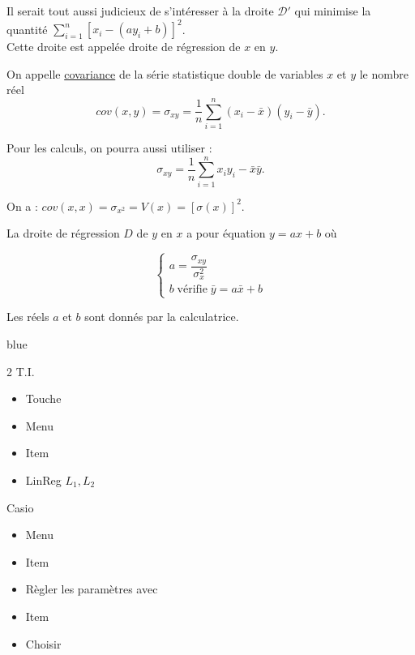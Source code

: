 \documentclass[french]{book}
\newcommand{\Syst}[2]{\left\{\begin{array}{lcccc} #1 \\ #2 \end{array}\right.}
\begin{document}
\begin{rem}
   Il serait tout aussi judicieux de s'intéresser à la droite $\mathcal{D}'$ qui minimise la quantité $\displaystyle{\sum_{i=1}^n [x_i-(ay_i+b)]^2}$. \\
   Cette droite est appelée droite de régression de $x$ en $y$.
\end{rem}



\begin{defn}
   On appelle \underline{covariance} de la série statistique double de variables $x$ et $y$ le nombre réel
$$cov(x,y)=\sigma_{xy}=\frac1n\sum_{i=1}^n (x_i - \bar x) (y_i - \bar y).$$
\end{defn}

Pour les calculs, on pourra aussi utiliser :
$$\sigma_{xy}=\frac1n\sum_{i=1}^n x_i y_i-\bar x\bar y.$$

\begin{rem}
   On a : \quad $cov(x,x)=\sigma_{x^2}=V(x)=[\sigma(x)]^2$.
\end{rem}



\begin{prop}
   La droite de régression $D$ de $y$ en $x$ a pour équation $y=ax+b$ où 
   
  
  $$\Syst{a=\dfrac{\sigma_{xy}}{\sigma_{x}^2}}{b \; \text{vérifie} \; \bar y = a\bar x +b}$$
\end{prop}

\begin{rem}
   Les réels $a$ et $b$ sont donnés par la calculatrice.
\end{rem}

\begin{color}{blue}
\begin{multicols}{2}
   T.I.
   \begin{itemize}
      \item[$\bullet$] Touche 
      \item[$\bullet$] Menu 
      \item[$\bullet$] Item 
      \item[$\bullet$] LinReg $L_1,L_2$ \\
   \end{itemize}
   Casio
   \begin{itemize}
      \item[$\bullet$] Menu 
      \item[$\bullet$] Item 
      \item[$\bullet$] Règler les paramètres avec
      \item[$\bullet$] Item 
      \item[$\bullet$] Choisir 
   \end{itemize}
\end{multicols}
\end{color}
\end{document}
